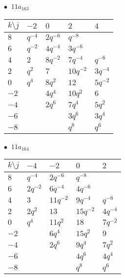 \begin{minipage}{\linewidth}
$\bullet\ $ $11a_{163}$ \vspace{0.5em} \\
\begin{tabular}{l|llll}
$k \setminus j$ & $-2$ & $0$ & $2$ & $4$ \\
\hline
$8$ & $q^{-4}$ & $2q^{-6}$ & $q^{-8}$ &  \\
$6$ & $q^{-2}$ & $4q^{-4}$ & $3q^{-6}$ &  \\
$4$ & $2$ & $8q^{-2}$ & $7q^{-4}$ & $q^{-6}$ \\
$2$ & $q^{2}$ & $7$ & $10q^{-2}$ & $3q^{-4}$ \\
$0$ & $q^{4}$ & $8q^{2}$ & $12$ & $5q^{-2}$ \\
$-2$ &  & $4q^{4}$ & $10q^{2}$ & $6$ \\
$-4$ &  & $2q^{6}$ & $7q^{4}$ & $5q^{2}$ \\
$-6$ &  &  & $3q^{6}$ & $3q^{4}$ \\
$-8$ &  &  & $q^{8}$ & $q^{6}$ \\
\end{tabular}
\vspace{2em}
\end{minipage}
%
\begin{minipage}{\linewidth}
$\bullet\ $ $11a_{164}$ \vspace{0.5em} \\
\begin{tabular}{l|llll}
$k \setminus j$ & $-4$ & $-2$ & $0$ & $2$ \\
\hline
$8$ & $q^{-4}$ & $2q^{-6}$ & $q^{-8}$ &  \\
$6$ & $2q^{-2}$ & $6q^{-4}$ & $4q^{-6}$ &  \\
$4$ & $3$ & $11q^{-2}$ & $9q^{-4}$ & $q^{-6}$ \\
$2$ & $2q^{2}$ & $13$ & $15q^{-2}$ & $4q^{-4}$ \\
$0$ & $q^{4}$ & $11q^{2}$ & $18$ & $7q^{-2}$ \\
$-2$ &  & $6q^{4}$ & $15q^{2}$ & $9$ \\
$-4$ &  & $2q^{6}$ & $9q^{4}$ & $7q^{2}$ \\
$-6$ &  &  & $4q^{6}$ & $4q^{4}$ \\
$-8$ &  &  & $q^{8}$ & $q^{6}$ \\
\end{tabular}
\vspace{2em}
\end{minipage}
%
